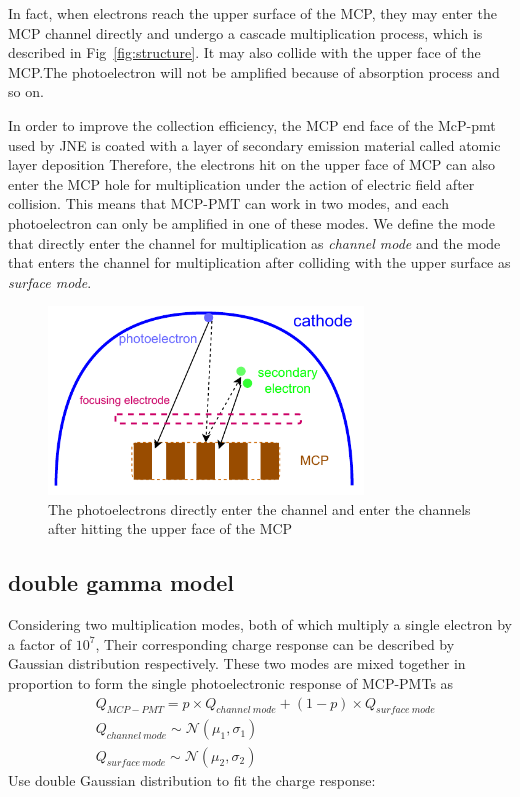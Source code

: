 \documentclass{article}
\begin{document}
In fact, when electrons reach the upper surface of the MCP, 
they may enter the MCP channel directly and undergo a cascade multiplication process, 
which is described in Fig~\ref{fig:structure}. 
It may also collide with the upper face of the MCP.\@ The photoelectron will not be amplified because of absorption process and so on.

In order to improve the collection efficiency, 
the MCP end face of the McP-pmt used by JNE is coated with a layer of secondary emission material called atomic layer deposition 
Therefore, the electrons hit on the upper face of MCP can also enter the MCP hole for multiplication 
under the action of electric field after collision. This means that MCP-PMT can work in two modes, 
and each photoelectron can only be amplified in one of these modes. We define the mode that directly enter  the channel for multiplication as \textit{channel mode} and   
the mode that enters the channel for multiplication after colliding with the upper surface as \textit{surface mode}.
\begin{figure}[ht]
    \centering
    \includegraphics[height=5cm]{pic/MCPelectron.pdf}
    \caption{The photoelectrons directly enter the channel and enter the channels after hitting the upper face of the MCP}\label{fig:MCP}
\end{figure}
\subsection{double gamma model}\label{subsec:doublegamma}
Considering two multiplication modes, both of which multiply a single electron by a factor of $10^7$, 
Their corresponding charge response can be described by Gaussian distribution respectively. 
These two modes are mixed together in proportion to form the single photoelectronic response of MCP-PMTs as 
\begin{equation}
    \label{eq:doublegaus}
    \begin{aligned}
        & Q_{MCP-PMT} = p\times Q_{channel\  mode} + (1-p)\times Q_{surface\  mode} \\
        & Q_{channel\  mode} \sim \mathcal{N} (\mu_1, \sigma_1) \\
        & Q_{surface\  mode} \sim \mathcal{N} (\mu_2, \sigma_2)
    \end{aligned}
\end{equation}
Use double Gaussian distribution to fit the charge response:
\end{document}
